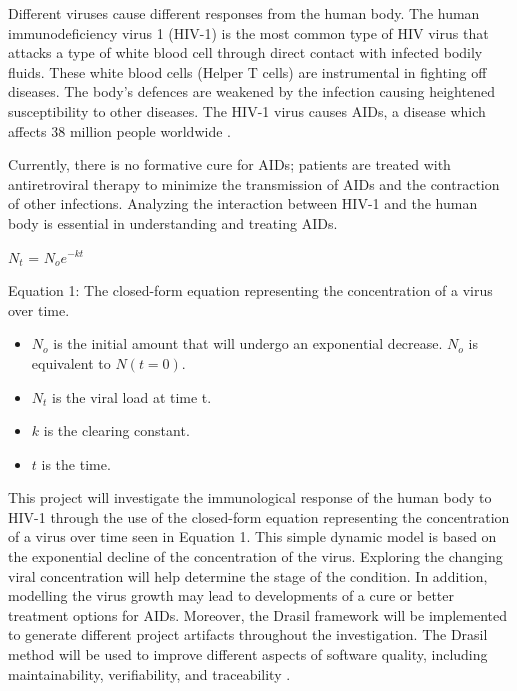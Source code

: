 \documentclass[12pt]{article}
\begin{document}
Different viruses cause different responses from the human body. The human 
immunodeficiency virus 1 (HIV-1) is the most common type of HIV virus that 
attacks a type of white blood cell through direct contact with infected bodily 
fluids. These white blood cells (Helper T cells) are instrumental in fighting 
off 
diseases. The body’s defences are weakened by the infection causing heightened 
susceptibility to other diseases. The HIV-1 virus causes AIDs, a disease which 
affects 38 million people worldwide \citep{who}.

Currently, there is no formative cure for AIDs; patients are treated with 
antiretroviral therapy to minimize the transmission of AIDs and the contraction 
of other infections. Analyzing the interaction between HIV-1 and the human body 
is essential in understanding and treating AIDs. 

\begin{center}
$N_t$ = $N_{o} e^{-k t}$

Equation 1: The closed-form equation representing the concentration of a virus 
over time. 
\end{center}

\begin{itemize}

  \item $N_{o}$ is the initial amount that will undergo an exponential 
decrease. $N_{o}$ is equivalent to $N(t= 0)$.
  \item $N_t$ is the viral load at time t.
  \item $k$ is the clearing constant.
  \item  $t$ is the time.

\end{itemize}

This project will investigate the immunological response of the human body to 
HIV-1 through the use of the closed-form equation representing the concentration 
of a virus over time seen in Equation  1. This simple dynamic 
model is based on the exponential decline of the concentration of the virus. 
Exploring the changing viral concentration will help determine the 
stage of the condition. In addition, modelling the virus 
growth may lead to developments of a cure or better treatment options for AIDs. 
Moreover, the Drasil framework will be implemented to generate different project 
artifacts throughout the investigation. The Drasil method will be used to 
improve different aspects of software quality, including maintainability, 
verifiability, and traceability \citep{Drasilcreate}.

\newpage



\end{document}

